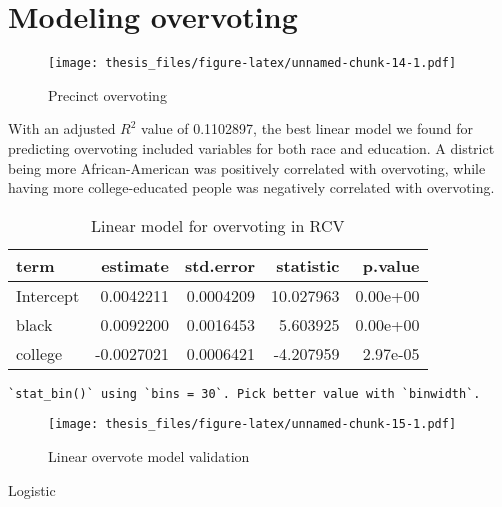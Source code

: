 \documentclass[12pt,twoside]{reedthesis}
\theoremstyle{definition}
\theoremstyle{definition}
\theoremstyle{definition}
\theoremstyle{remark}
\begin{document}
\hypertarget{modeling-overvoting}{%
\section{Modeling overvoting}\label{modeling-overvoting}}
\begin{figure}
\centering
\texttt{[image: thesis\_files/figure-latex/unnamed-chunk-14-1.pdf]}
\caption{\label{fig:unnamed-chunk-14}Precinct overvoting}
\end{figure}
With an adjusted \(R^2\) value of 0.1102897, the best linear model we
found for predicting overvoting included variables for both race and
education. A district being more African-American was positively
correlated with overvoting, while having more college-educated people
was negatively correlated with overvoting.
\begin{longtable}[t]{lrrrr}
\caption[Linear overvote model]{\label{tab:unnamed-chunk-15}Linear model for overvoting in RCV}\\
\toprule
term & estimate & std.error & statistic & p.value\\
\midrule
Intercept & 0.0042211 & 0.0004209 & 10.027963 & 0.00e+00\\
black & 0.0092200 & 0.0016453 & 5.603925 & 0.00e+00\\
college & -0.0027021 & 0.0006421 & -4.207959 & 2.97e-05\\
\bottomrule
\end{longtable}
\begin{verbatim}
`stat_bin()` using `bins = 30`. Pick better value with `binwidth`.
\end{verbatim}
\begin{figure}
\centering
\texttt{[image: thesis\_files/figure-latex/unnamed-chunk-15-1.pdf]}
\caption{\label{fig:unnamed-chunk-15}Linear overvote model validation}
\end{figure}
Logistic
\end{document}
